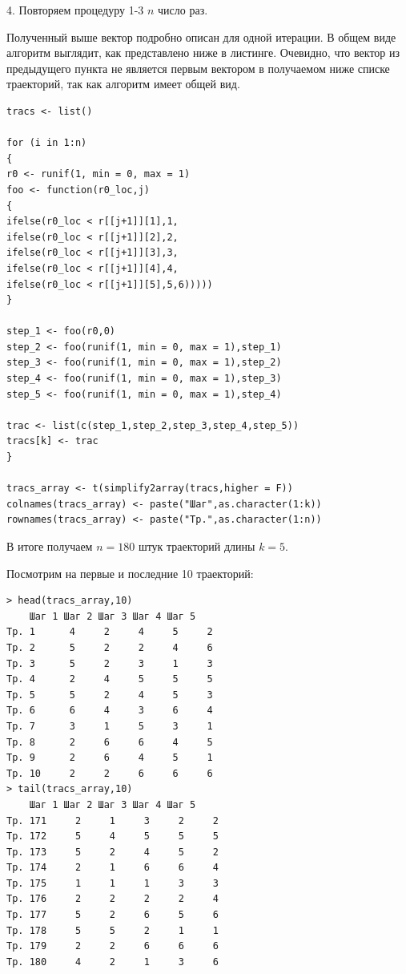 \documentclass[14pt,a4paper]{scrartcl}
\begin{document}
4. Повторяем процедуру 1-3 $n$ число раз.

Полученный выше вектор подробно описан для одной итерации. В общем виде алгоритм выглядит, как представлено ниже в листинге. Очевидно, что вектор из предыдущего пункта не является первым вектором в получаемом ниже списке траекторий, так как алгоритм имеет общей вид.
\begin{verbatim}
tracs <- list()

for (i in 1:n)
{
r0 <- runif(1, min = 0, max = 1)
foo <- function(r0_loc,j)
{
ifelse(r0_loc < r[[j+1]][1],1,
ifelse(r0_loc < r[[j+1]][2],2,
ifelse(r0_loc < r[[j+1]][3],3,
ifelse(r0_loc < r[[j+1]][4],4,
ifelse(r0_loc < r[[j+1]][5],5,6)))))
}

step_1 <- foo(r0,0)
step_2 <- foo(runif(1, min = 0, max = 1),step_1)
step_3 <- foo(runif(1, min = 0, max = 1),step_2)
step_4 <- foo(runif(1, min = 0, max = 1),step_3)
step_5 <- foo(runif(1, min = 0, max = 1),step_4)

trac <- list(c(step_1,step_2,step_3,step_4,step_5))
tracs[k] <- trac
}

tracs_array <- t(simplify2array(tracs,higher = F))
colnames(tracs_array) <- paste("Шаг",as.character(1:k))
rownames(tracs_array) <- paste("Тр.",as.character(1:n))
\end{verbatim}

В итоге получаем $n=180$ штук траекторий длины $k=5$.

Посмотрим на первые и последние 10 траекторий:

\begin{verbatim}
> head(tracs_array,10)
	Шаг 1 Шаг 2 Шаг 3 Шаг 4 Шаг 5
Тр. 1      4     2     4     5     2
Тр. 2      5     2     2     4     6
Тр. 3      5     2     3     1     3
Тр. 4      2     4     5     5     5
Тр. 5      5     2     4     5     3
Тр. 6      6     4     3     6     4
Тр. 7      3     1     5     3     1
Тр. 8      2     6     6     4     5
Тр. 9      2     6     4     5     1
Тр. 10     2     2     6     6     6
> tail(tracs_array,10)
	Шаг 1 Шаг 2 Шаг 3 Шаг 4 Шаг 5
Тр. 171     2     1     3     2     2
Тр. 172     5     4     5     5     5
Тр. 173     5     2     4     5     2
Тр. 174     2     1     6     6     4
Тр. 175     1     1     1     3     3
Тр. 176     2     2     2     2     4
Тр. 177     5     2     6     5     6
Тр. 178     5     5     2     1     1
Тр. 179     2     2     6     6     6
Тр. 180     4     2     1     3     6
\end{verbatim}
\end{document}

